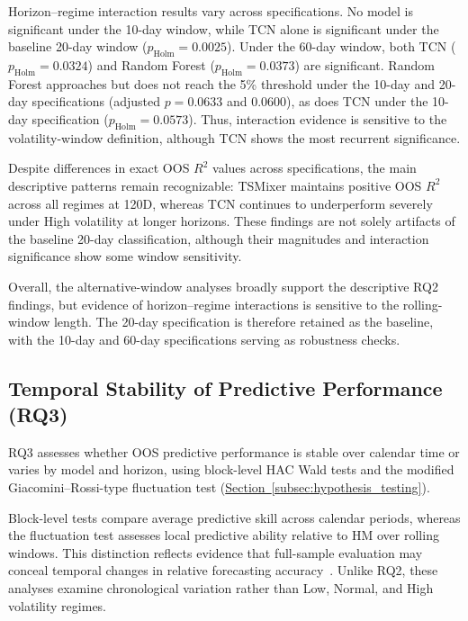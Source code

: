 \documentclass[runningheads,orivec]{llncs}
\makeatletter
\providecommand{\FloatBarrier}{\par\ifx\@deferlist\@empty\else\clearpage\fi}
\makeatother
\begin{document}
Horizon--regime interaction results vary across specifications. No model is significant under the 10-day window, while TCN alone is significant under the baseline 20-day window ($p_{\mathrm{Holm}}=0.0025$). Under the 60-day window, both TCN ($p_{\mathrm{Holm}}=0.0324$) and Random Forest ($p_{\mathrm{Holm}}=0.0373$) are significant. Random Forest approaches but does not reach the 5\% threshold under the 10-day and 20-day specifications (adjusted $p=0.0633$ and $0.0600$), as does TCN under the 10-day specification ($p_{\mathrm{Holm}}=0.0573$). Thus, interaction evidence is sensitive to the volatility-window definition, although TCN shows the most recurrent significance.

Despite differences in exact OOS $R^2$ values across specifications, the main descriptive patterns remain recognizable: TSMixer maintains positive OOS $R^2$ across all regimes at 120D, whereas TCN continues to underperform severely under High volatility at longer horizons. These findings are not solely artifacts of the baseline 20-day classification, although their magnitudes and interaction significance show some window sensitivity.

Overall, the alternative-window analyses broadly support the descriptive RQ2 findings, but evidence of horizon--regime interactions is sensitive to the rolling-window length. The 20-day specification is therefore retained as the baseline, with the 10-day and 60-day specifications serving as robustness checks.

\FloatBarrier
\subsection{Temporal Stability of Predictive Performance (RQ3)}\label{subsec:temporal_stability}

RQ3 assesses whether OOS predictive performance is stable over calendar time or varies by model and horizon, using block-level HAC Wald tests and the modified Giacomini--Rossi-type fluctuation test (\hyperref[subsec:hypothesis_testing]{Section~\ref*{subsec:hypothesis_testing}}).

Block-level tests compare average predictive skill across calendar periods, whereas the fluctuation test assesses local predictive ability relative to HM over rolling windows. This distinction reflects evidence that full-sample evaluation may conceal temporal changes in relative forecasting accuracy~\cite{giacomini2010}. Unlike RQ2, these analyses examine chronological variation rather than Low, Normal, and High volatility regimes.
\end{document}

